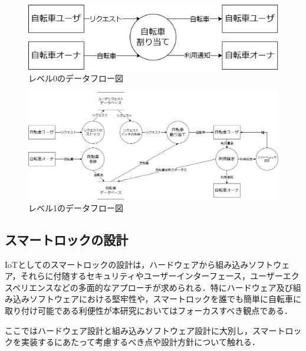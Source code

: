           \begin{figure}[b]
            \centering
            \includegraphics[scale=0.4]
            {figures/dfd-level0.drawio.png}
            \caption{レベル0のデータフロー図}
            \label{fig:レベル0のデータフロー図}
          \end{figure}

          \begin{figure}[b]
            \centering
            \includegraphics[scale=0.4]
            {figures/dfd-level1.drawio.png}
            \caption{レベル1のデータフロー図}
            \label{fig:レベル1のデータフロー図}
          \end{figure}

  \subsection{スマートロックの設計}
    \label{sec:スマートロックの設計}
      \par IoTとしてのスマートロックの設計は，ハードウェアから組み込みソフトウェア，それらに付随するセキュリティやユーザーインターフェース，ユーザーエクスペリエンスなどの多面的なアプローチが求められる．特にハードウェア及び組み込みソフトウェアにおける堅牢性や，スマートロックを誰でも簡単に自転車に取り付け可能である利便性が本研究においてはフォーカスすべき観点である．
      \par ここではハードウェア設計と組み込みソフトウェア設計に大別し，スマートロックを実装するにあたって考慮するべき点や設計方針について触れる．
      
